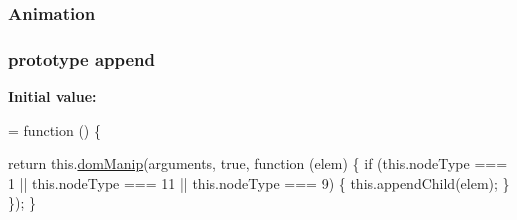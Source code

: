 \subsubsection[{\texorpdfstring{Animation}{Animation}}]{ Animation}\hypertarget{jquery-2_82_81-vsdoc_8js_a3299b781c8ec8287357326920ab3565a}{}\label{jquery-2_82_81-vsdoc_8js_a3299b781c8ec8287357326920ab3565a}
\subsubsection[{\texorpdfstring{append}{append}}]{ {\bf prototype} append}\hypertarget{jquery-2_82_81-vsdoc_8js_a6b9ad5e0cf5c7480e9a327c771349a90}{}\label{jquery-2_82_81-vsdoc_8js_a6b9ad5e0cf5c7480e9a327c771349a90}
{\bfseries Initial value\+:}
\begin{DoxyCode}
= \textcolor{keyword}{function} () \{
        

        \textcolor{keywordflow}{return} this.\hyperlink{jquery-2_82_81-vsdoc_8js_a00a63bd312ef048290dc1755ccb8bae4}{domManip}(arguments, \textcolor{keyword}{true}, \textcolor{keyword}{function} (elem) \{
            \textcolor{keywordflow}{if} (this.nodeType === 1 || this.nodeType === 11 || this.nodeType === 9) \{
                this.appendChild(elem);
            \}
        \});
    \}
\end{DoxyCode}
